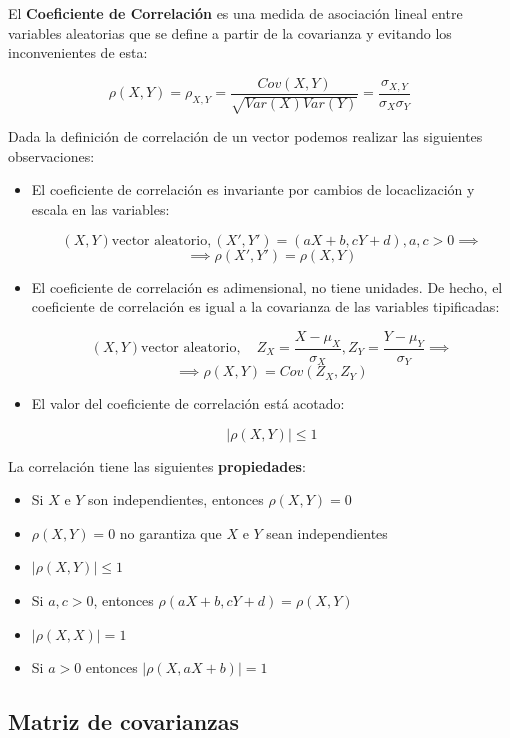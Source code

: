 \documentclass{article}
\begin{document}
El \textbf{Coeficiente de Correlación} es una medida de asociación lineal entre variables aleatorias que se define a partir de la covarianza
y evitando los inconvenientes de esta: 

\[ \rho(X, Y) = \rho_{X, Y} = \frac{Cov(X, Y)}{\sqrt{Var(X)Var(Y)}} = \frac{\sigma_{X, Y}}{\sigma_X\sigma_Y} \]

Dada la definición de correlación de un vector podemos realizar las siguientes observaciones: 

\begin{itemize}
    \item El coeficiente de correlación es invariante por cambios de locaclización y escala en las variables:
    
    \[ (X, Y) \text{vector aleatorio}, (X', Y') = (aX + b, cY + d), a, c > 0 \implies \]
    \[ \implies \rho(X', Y') = \rho(X, Y) \]

    \item El coeficiente de correlación es adimensional, no tiene unidades. De hecho, el coeficiente de correlación es igual a la covarianza
            de las variables tipificadas:

    \[ (X, Y) \text{vector aleatorio}, \quad Z_{X} = \frac{X - \mu_{X}}{\sigma_X}, Z_{Y} = \frac{Y - \mu_Y}{\sigma_Y} \implies \]
    \[ \implies \rho(X, Y) = Cov(Z_X, Z_Y) \]

    \item El valor del coeficiente de correlación está acotado:
    
    \[ |\rho(X, Y)| \leq 1 \]


\end{itemize}

La correlación tiene las siguientes \textbf{propiedades}:
\begin{itemize}
    \item Si $X$ e $Y$ son independientes, entonces $\rho(X, Y) = 0$
    \item $\rho(X, Y) = 0$ no garantiza que $X$ e $Y$ sean independientes
    \item $|\rho(X, Y)| \leq 1$
    \item Si $a, c > 0$, entonces $\rho(aX + b, cY + d) = \rho(X, Y)$
    \item $|\rho(X, X)| = 1$
    \item Si $a > 0$ entonces $|\rho(X, aX + b)| = 1$
\end{itemize}

\newpage

\subsection{Matriz de covarianzas}
\end{document}
